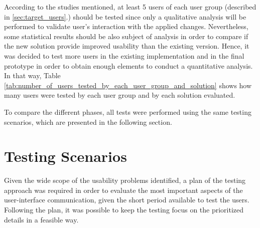 According to the studies mentioned, at least 5 users of each user group (described in \ref{sec:target_users}.) should be tested since only a qualitative analysis will be performed to validate user's interaction with the applied changes. Nevertheless, some statistical results should be also subject of analysis in order to compare if the new solution provide improved usability than the existing version. Hence, it was decided to test more users in the existing implementation and in the final prototype in order to obtain enough elements to conduct a quantitative analysis. In that way, Table \ref{tab:number_of_users_tested_by_each_user_group_and_solution} shows how many users were tested by each user group and by each solution evaluated.

\begin{table}[tb]
	\caption{Number of users tested by each user group and by each solution evaluated}
	\label{tab:number_of_users_tested_by_each_user_group_and_solution}
\centering
{}
\end{table}

To compare the different phases, all tests were performed using the same testing scenarios, which are presented in the following section.


\section{Testing Scenarios}
\label{sec:testing_scenarios}
Given the wide scope of the usability problems identified, a plan of the testing approach was required in order to evaluate the most important aspects of the user-interface communication, given the short period available to test the users. Following the plan, it was possible to keep the testing focus on the prioritized details in a feasible way.

